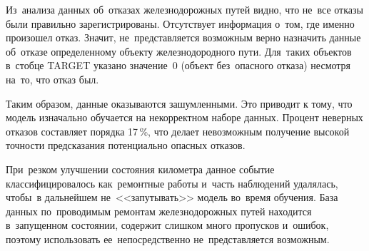 Из~анализа данных об~отказах железнодорожных путей видно, что не~все отказы были 
правильно зарегистрированы. Отсутствует информация о~том, где именно 
произошел отказ. Значит, не~представляется возможным верно назначить данные об~отказе
определенному объекту железнодородного пути. Для~таких объектов в~стобце
TARGET указано значение~0 (объект без~опасного отказа) несмотря на~то, что отказ был.
 
Таким образом, данные оказываются зашумленными. Это приводит к тому, что модель изначально
обучается на некорректном наборе данных. Процент неверных отказов составляет порядка 17\,\%, что 
делает невозможным получение высокой точности предсказания потенциально опасных отказов.

При~резком улучшении состояния километра данное событие классифицировалось 
как~ремонтные работы и~часть наблюдений удалялась, чтобы~в дальнейшем не~<<запутывать>> модель во~время обучения.
База данных по~проводимым ремонтам железнодорожных путей находится в~запущенном состоянии, содержит 
слишком много пропусков и~ошибок, поэтому использовать ее~непосредственно не~представляется возможным.

